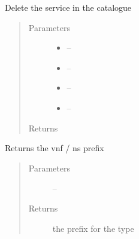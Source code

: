 \documentclass[letterpaper,10pt,english]{sphinxmanual}
\begin{document}

\begin{fulllineitems}
\label{_source/son_editor.impl:son_editor.impl.catalogue_servicesimpl.delete_service_catalogue}
Delete the service in the catalogue
\begin{quote}\begin{description}
\item[{Parameters}] \leavevmode\begin{itemize}
\item {} 
 -- 

\item {} 
 -- 

\item {} 
 -- 

\item {} 
 -- 

\end{itemize}

\item[{Returns}] \leavevmode


\end{description}\end{quote}

\end{fulllineitems}


\begin{fulllineitems}
\label{_source/son_editor.impl:son_editor.impl.catalogue_servicesimpl.getType}
Returns the vnf / ns prefix
\begin{quote}\begin{description}
\item[{Parameters}] \leavevmode
{} -- 

\item[{Returns}] \leavevmode
the prefix for the type

\end{description}\end{quote}

\end{fulllineitems}
\end{document}
